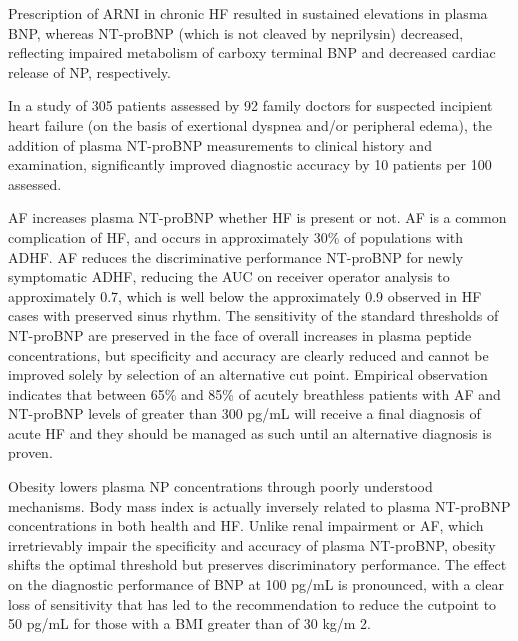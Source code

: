 \documentclass[14pt,a4paper,onecolumn]{extarticle}
\begin{document}
Prescription of ARNI in chronic HF resulted in sustained elevations in plasma BNP, whereas NT-proBNP (which is not cleaved by neprilysin) decreased, reflecting impaired metabolism of carboxy terminal BNP and decreased cardiac release of NP, respectively. \citep{Packer2015} %

In a study of 305 patients assessed by 92 family doctors for suspected incipient heart failure (on the basis of exertional dyspnea and/or peripheral edema), the addition of plasma NT-proBNP measurements to clinical history and examination, significantly improved diagnostic accuracy by 10 patients per 100 assessed. \citep{bib3133} %

AF increases plasma NT-proBNP whether HF is present or not. AF is a common complication of HF, and occurs in approximately 30\% of populations with ADHF. AF reduces the discriminative performance NT-proBNP for newly symptomatic ADHF, reducing the AUC on receiver operator analysis to approximately 0.7, which is well below the approximately 0.9 observed in HF cases with preserved sinus rhythm.  The sensitivity of the standard thresholds of NT-proBNP are preserved in the face of overall increases in plasma peptide concentrations, but specificity and accuracy are clearly reduced and cannot be improved solely by selection of an alternative cut point. Empirical observation indicates that between 65\% and 85\% of acutely breathless patients with AF and NT-proBNP levels of greater than 300 pg/mL will receive a final diagnosis of acute HF and they should be managed as such until an alternative diagnosis is proven.  \citep{Richards2013} %

Obesity lowers plasma NP concentrations through poorly understood mechanisms. Body mass index is actually inversely related to plasma NT-proBNP concentrations in both health and HF. Unlike renal impairment or AF, which irretrievably impair the specificity and accuracy of plasma NT-proBNP, obesity shifts the optimal threshold but preserves discriminatory performance. The effect on the diagnostic performance of BNP at 100 pg/mL is pronounced, with a clear loss of sensitivity that has led to the recommendation to reduce the cutpoint to 50 pg/mL for those with a BMI greater than of 30 kg/m 2. \citep{Daniels2006} %
\end{document}
